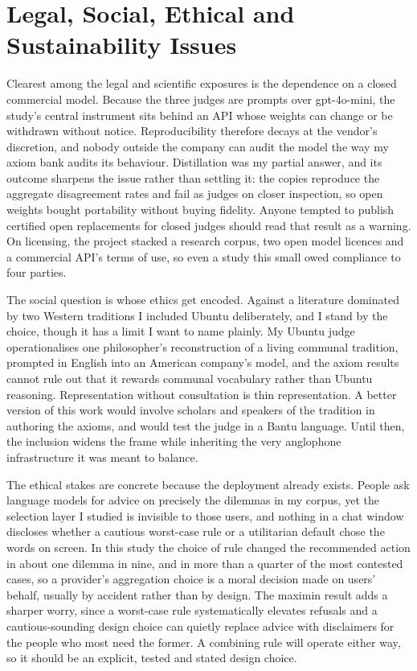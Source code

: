 \documentclass[11pt,a4paper]{article}
\begin{document}
\section*{Legal, Social, Ethical and Sustainability Issues}

Clearest among the legal and scientific exposures is the dependence on a closed commercial model. Because the three judges are prompts over gpt-4o-mini, the study's central instrument sits behind an API whose weights can change or be withdrawn without notice. Reproducibility therefore decays at the vendor's discretion, and nobody outside the company can audit the model the way my axiom bank audits its behaviour. Distillation was my partial answer, and its outcome sharpens the issue rather than settling it: the copies reproduce the aggregate disagreement rates and fail as judges on closer inspection, so open weights bought portability without buying fidelity. Anyone tempted to publish certified open replacements for closed judges should read that result as a warning. On licensing, the project stacked a research corpus, two open model licences and a commercial API's terms of use, so even a study this small owed compliance to four parties.

The social question is whose ethics get encoded. Against a literature dominated by two Western traditions I included Ubuntu deliberately, and I stand by the choice, though it has a limit I want to name plainly. My Ubuntu judge operationalises one philosopher's reconstruction of a living communal tradition, prompted in English into an American company's model, and the axiom results cannot rule out that it rewards communal vocabulary rather than Ubuntu reasoning. Representation without consultation is thin representation. A better version of this work would involve scholars and speakers of the tradition in authoring the axioms, and would test the judge in a Bantu language. Until then, the inclusion widens the frame while inheriting the very anglophone infrastructure it was meant to balance.

The ethical stakes are concrete because the deployment already exists. People ask language models for advice on precisely the dilemmas in my corpus, yet the selection layer I studied is invisible to those users, and nothing in a chat window discloses whether a cautious worst-case rule or a utilitarian default chose the words on screen. In this study the choice of rule changed the recommended action in about one dilemma in nine, and in more than a quarter of the most contested cases, so a provider's aggregation choice is a moral decision made on users' behalf, usually by accident rather than by design. The maximin result adds a sharper worry, since a worst-case rule systematically elevates refusals and a cautious-sounding design choice can quietly replace advice with disclaimers for the people who most need the former. A combining rule will operate either way, so it should be an explicit, tested and stated design choice.
\end{document}
